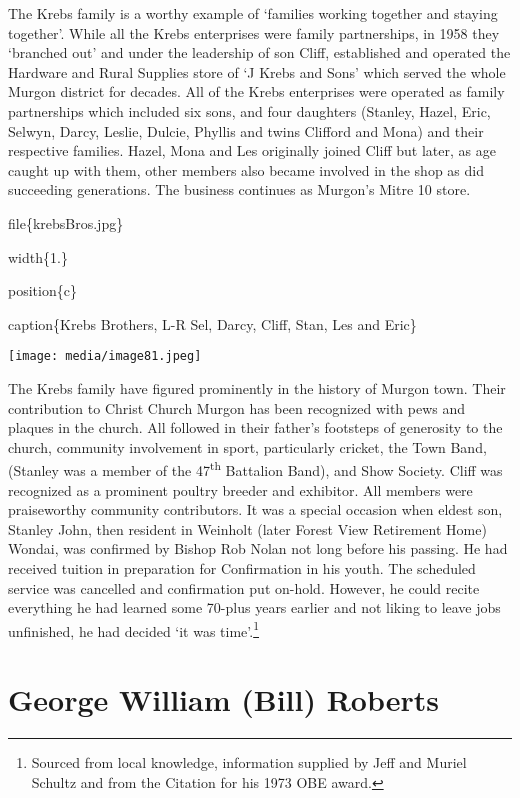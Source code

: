 The Krebs family is a worthy example of `families working together and staying together'. While all the Krebs enterprises were family partnerships, in 1958 they `branched out' and under the leadership of son Cliff, established and operated the Hardware and Rural Supplies store of `J Krebs and Sons' which served the whole Murgon district for decades. All of the Krebs enterprises were operated as family partnerships which included six sons, and four daughters (Stanley, Hazel, Eric, Selwyn, Darcy, Leslie, Dulcie, Phyllis and twins Clifford and Mona) and their respective families. Hazel, Mona and Les originally joined Cliff but later, as age caught up with them, other members also became involved in the shop as did succeeding generations. The business continues as Murgon's Mitre 10 store.

file\{krebsBros.jpg\}

width\{1.\}

position\{c\}

caption\{Krebs Brothers, L-R Sel, Darcy, Cliff, Stan, Les and Eric\}

\texttt{[image: media/image81.jpeg]}

The Krebs family have figured prominently in the history of Murgon town. Their contribution to Christ Church Murgon has been recognized with pews and plaques in the church. All followed in their father's footsteps of generosity to the church, community involvement in sport, particularly cricket, the Town Band, (Stanley was a member of the 47\textsuperscript{th} Battalion Band), and Show Society. Cliff was recognized as a prominent poultry breeder and exhibitor. All members were praiseworthy community contributors. It was a special occasion when eldest son, Stanley John, then resident in Weinholt (later Forest View Retirement Home) Wondai, was confirmed by Bishop Rob Nolan not long before his passing. He had received tuition in preparation for Confirmation in his youth. The scheduled service was cancelled and confirmation put on-hold. However, he could recite everything he had learned some 70-plus years earlier and not liking to leave jobs unfinished, he had decided `it was time'.\footnote{Sourced from local knowledge, information supplied by Jeff and Muriel Schultz and from the Citation for his 1973 OBE award.}

\hypertarget{george-william-bill-roberts}{%
\section{George William (Bill) Roberts}\label{george-william-bill-roberts}}

